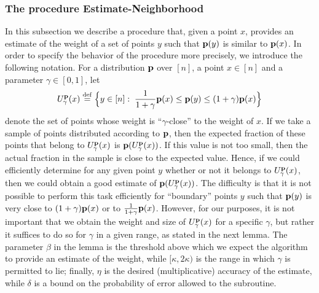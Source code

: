 \subsubsection{The procedure {\sc Estimate-Neighborhood}}\label{subsec:est-n}
In this subsection we describe a procedure that, given a point $x$,
provides an estimate of the weight of a set of points $y$ such
that $\mathbf{p}(y)$ is similar to $\mathbf{p}(x)$. In order to specify the behavior
of the procedure more precisely, we introduce the following notation.
For a distribution $\mathbf{p}$ over $[n]$, a point $x \in [n]$ and
a parameter $\gamma \in [0,1]$, let
\begin{equation}\label{eq:Ugamma}
U^{\mathbf{p}}_\gamma(x) \stackrel{\rm def}{=} \Big\{y \in [n]:\; \frac{1}{1+\gamma}\mathbf{p}(x)
             \leq \mathbf{p}(y) \leq (1+\gamma)\mathbf{p}(x)\Big\}
\end{equation}
denote the set of points whose weight is ``$\gamma$-close'' to
the weight of $x$.
If we take a sample of points distributed according to $\mathbf{p}$, then
the expected fraction of these points that belong to $U^{\mathbf{p}}_\gamma(x)$
is $\mathbf{p}(U^{\mathbf{p}}_\gamma(x))$.
If this value is
not too small, then the actual fraction in the sample is close to the
expected value. Hence, if we could efficiently determine for
any given point $y$ whether or not it belongs to $U^{\mathbf{p}}_\gamma(x)$, then
we could obtain a good estimate of $\mathbf{p}(U^{\mathbf{p}}_\gamma(x))$.
The difficulty is that it is not possible to
perform this task efficiently for {``boundary''} points $y$ such that
$\mathbf{p}(y)$ is very close to $(1+\gamma)\mathbf{p}(x)$ or
to $\frac{1}{1+\gamma}\mathbf{p}(x)$. However, for our purposes, it is not
important that we obtain the weight and size of $U^{\mathbf{p}}_\gamma(x)$
for a specific $\gamma$, but rather it suffices to do so for $\gamma$
in a given range, as stated in the next lemma.
The parameter $\beta$ in the lemma is the threshold above which we expect the algorithm to provide an estimate of the weight, while $[\kappa,2\kappa)$ is the range in which $\gamma$ is permitted to lie; finally, $\eta$ is the desired (multiplicative) accuracy of the estimate, while $\delta$ is a bound on the probability of error allowed to the subroutine.
